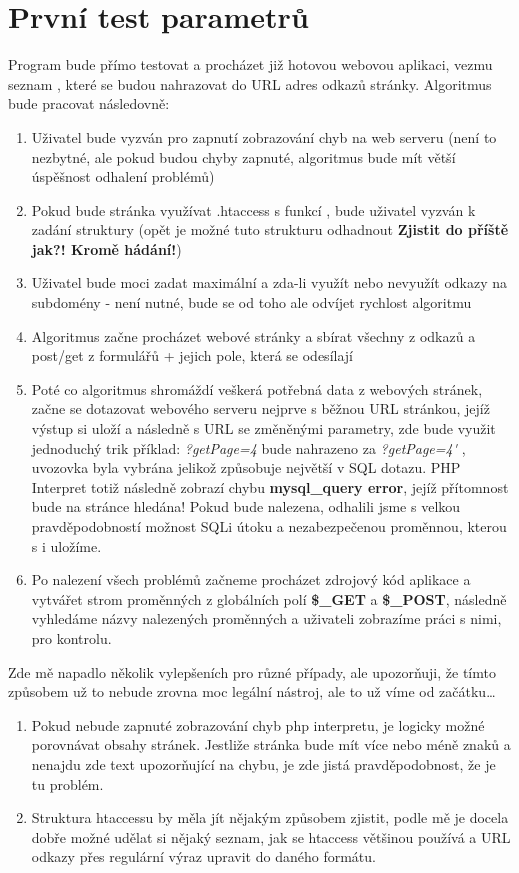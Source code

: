 \documentclass[12pt, a4paper]{report}
\begin{document}
\section{První test parametrů}
Program bude přímo testovat a procházet již hotovou webovou aplikaci, vezmu seznam , které se budou nahrazovat do URL adres odkazů stránky. Algoritmus bude pracovat následovně:
\begin{enumerate}
\item Uživatel bude vyzván pro zapnutí zobrazování chyb na web serveru (není to nezbytné, ale pokud budou chyby zapnuté, algoritmus bude mít větší úspěšnost odhalení problémů)
\item Pokud bude stránka využívat .htaccess s funkcí , bude uživatel vyzván k zadání struktury (opět je možné tuto strukturu odhadnout \textbf{Zjistit do příště jak?! Kromě hádání!})
\item Uživatel bude moci zadat maximální  a zda-li využít nebo nevyužít odkazy na subdomény - není nutné, bude se od toho ale odvíjet rychlost algoritmu
\item Algoritmus začne procházet webové stránky a sbírat všechny  z odkazů a post/get z formulářů + jejich pole, která se odesílají
\item Poté co algoritmus shromáždí veškerá potřebná data z webových stránek, začne se dotazovat webového serveru nejprve s běžnou URL stránkou, jejíž výstup si uloží a následně s URL se změněnými parametry, zde bude využit jednoduchý trik příklad: \emph{ ?getPage=4 } bude nahrazeno za \emph{ ?getPage=4\' }, uvozovka byla vybrána jelikož způsobuje největší  v SQL dotazu. PHP Interpret totiž následně zobrazí chybu \textbf{mysql\_query error}, jejíž přítomnost bude na stránce hledána! Pokud bude nalezena, odhalili jsme s velkou pravděpodobností možnost SQLi útoku a nezabezpečenou proměnnou, kterou s i uložíme.
\item Po nalezení všech problémů začneme procházet zdrojový kód aplikace a vytvářet strom proměnných z globálních polí \textbf{\$\_GET} a \textbf{\$\_POST}, následně vyhledáme názvy nalezených proměnných a uživateli zobrazíme práci s nimi, pro kontrolu.
\end{enumerate}
Zde mě napadlo několik vylepšeních pro různé případy, ale upozorňuji, že tímto způsobem už to nebude zrovna moc legální nástroj, ale to už víme od začátku\ldots
\begin{enumerate}
\item Pokud nebude zapnuté zobrazování chyb php interpretu, je logicky možné porovnávat obsahy stránek. Jestliže stránka bude mít více nebo méně znaků a nenajdu zde text upozorňující na chybu, je zde jistá pravděpodobnost, že je tu problém.
\item Struktura htaccessu by měla jít nějakým způsobem zjistit, podle mě je docela dobře možné udělat si nějaký seznam, jak se htaccess většinou používá a URL odkazy přes regulární výraz upravit do daného formátu.
\end{enumerate}
\end{document}
